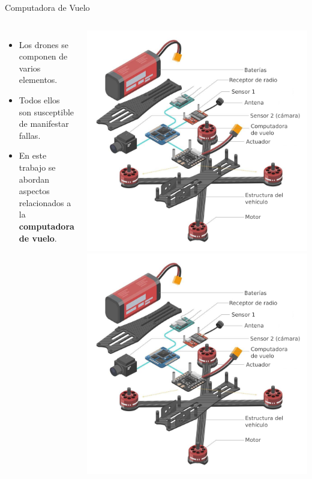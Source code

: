 \begin{frame}{Computadora de Vuelo}
	\begin{columns}
		\begin{itemize}
			\item <1->Los drones se componen de varios elementos.
			\item <3->Todos ellos son susceptible de manifestar fallas.
			\item <4->En este trabajo se abordan aspectos relacionados a la \textbf{computadora de vuelo}.
		\end{itemize}
			\begin{overprint}
				\includegraphics[width=\textwidth]{img/partes_de_un_drone.png}
				\onslide<3>\includegraphics[width=\textwidth]{img/partes_de_un_drone.png}

\end{overprint}
\end{columns}
\end{frame}
